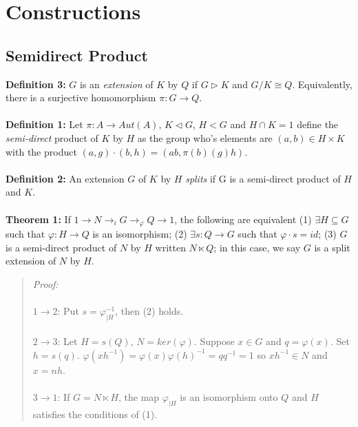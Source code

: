 \chapter{Constructions}
\section {Semidirect Product}
{\bf Definition 3:}
$G$ is an \emph{extension} of $K$ by $Q$ if $G \triangleright K$ and $G/K \cong Q$.  Equivalently,
there is a surjective homomorphism $\pi:G \rightarrow Q$.
\\
\\
{\bf Definition 1:} 
Let $\pi: A \rightarrow Aut(A)$, $K \lhd G$, $H<G$ and $H \cap K = 1$ define the
\emph {semi-direct} product of $K$ by $H$ as the group who's elements
are $(a,b) \in H \times K$ with the product $(a, g) \cdot (b,h)= (ab, \pi(b)(g)h)$.
\\
\\
{\bf Definition 2:} An extension $G$ of $K$ by $H$ \emph {splits} if G
is a semi-direct product of $H$ and $K$.
\\
\\
{\bf Theorem 1:}
If $1 \rightarrow N \rightarrow_{i} G \rightarrow_{\varphi} Q \rightarrow 1$, the following
are equivalent
(1) $\exists H \subseteq G$ such that $\varphi: H \rightarrow Q$ is an isomorphism;
(2) $\exists s:Q \rightarrow G$ such that $\varphi \cdot s = id$;
(3) $G$ is a semi-direct product of $N$ by $H$ written $N \ltimes Q$; in this
case, we say $G$ is a split extension of $N$ by $H$.
\begin{quote}
\emph{Proof:}
\\
\\
$1 \rightarrow 2$:
Put $s= \varphi_{|H}^{-1}$, then (2) holds.
\\
\\
$2 \rightarrow 3$:
Let $H= s(Q)$, $N= ker(\varphi)$.  Suppose $x \in G$ and $q= \varphi(x)$.  Set
$h= s(q)$.  $\varphi(x h^{-1})= \varphi(x) \varphi(h)^{-1} = q q^{-1}= 1$ so
$x h^{-1} \in N$ and $x= nh$.
\\
\\
$3 \rightarrow 1$:
If $G= N \ltimes H$, the map $\varphi_{|H}$ is an isomorphism onto $Q$ and $H$ satisfies the
conditions of (1).
\end{quote}
